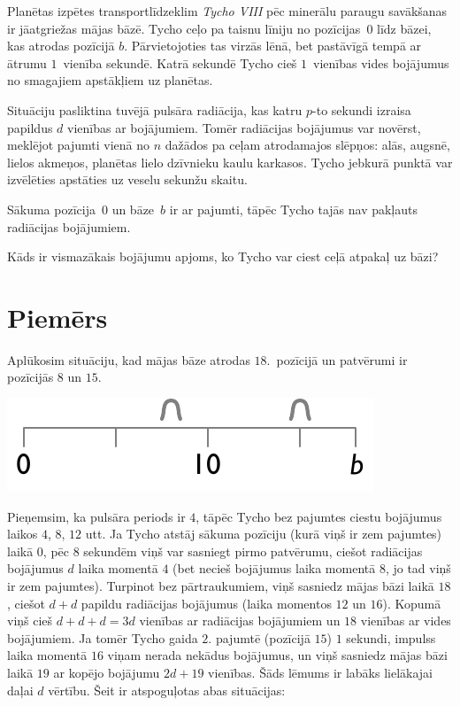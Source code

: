 

\noindent
Planētas izpētes transportlīdzeklim \emph{Tycho VIII} pēc minerālu paraugu savākšanas ir jāatgriežas mājas bāzē.
Tycho ceļo pa taisnu līniju no pozīcijas~$0$ līdz bāzei, kas atrodas pozīcijā $b$.
Pārvietojoties tas virzās lēnā, bet pastāvīgā tempā ar ātrumu $1$~vienība sekundē.
Katrā sekundē Tycho cieš $1$~vienības vides bojājumus no smagajiem apstākļiem uz planētas.

Situāciju pasliktina tuvējā pulsāra radiācija, kas katru $p$-to sekundi izraisa papildus $d$ vienības ar bojājumiem.
Tomēr radiācijas bojājumus var novērst, meklējot pajumti vienā no $n$ dažādos pa ceļam atrodamajos slēpņos: alās, augsnē, lielos akmeņos, planētas lielo dzīvnieku kaulu karkasos.
Tycho jebkurā punktā var izvēlēties apstāties uz veselu sekunžu skaitu.

Sākuma pozīcija~$0$ un bāze~$b$ ir ar pajumti, tāpēc Tycho tajās nav pakļauts radiācijas bojājumiem.

\medskip
Kāds ir vismazākais bojājumu apjoms, ko Tycho var ciest ceļā atpakaļ uz bāzi?

\section*{Piemērs}

Aplūkosim situāciju, kad mājas bāze atrodas $18$.~pozīcijā un patvērumi ir pozīcijās $8$ un $15$.

\includegraphics[width=.3\textwidth]{img/samplesetup}

Pieņemsim, ka pulsāra periods ir $4$, tāpēc Tycho bez pajumtes ciestu bojājumus laikos $4$, $8$, $12$ utt.
Ja Tycho atstāj sākuma pozīciju (kurā viņš ir zem pajumtes) laikā $0$, pēc $8$ sekundēm viņš var sasniegt pirmo patvērumu, ciešot radiācijas bojājumus $d$ laika momentā $4$ (bet necieš bojājumus laika momentā $8$, jo tad viņš ir zem pajumtes).
Turpinot bez pārtraukumiem, viņš sasniedz mājas bāzi laikā $18$, ciešot $d+d$ papildu radiācijas bojājumus (laika momentos $12$ un $16$).
Kopumā viņš cieš $d+d+d=3d$ vienības ar radiācijas bojājumiem un $18$ vienības ar vides bojājumiem.
Ja tomēr Tycho gaida $2.$ pajumtē (pozīcijā $15$) $1$ sekundi, impulss laika momentā $16$ viņam nerada nekādus bojājumus, un viņš sasniedz mājas bāzi laikā $19$ ar kopējo bojājumu $2d + 19$ vienības.
Šāds lēmums ir labāks lielākajai daļai $d$ vērtību.
Šeit ir atspoguļotas abas situācijas:

